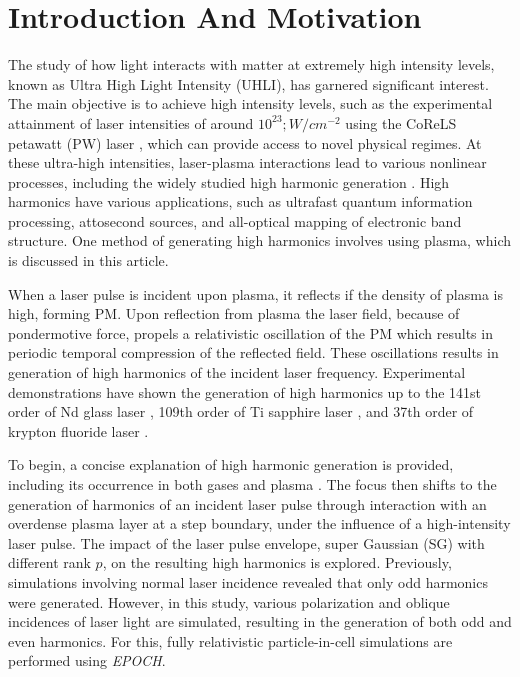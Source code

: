 \documentclass[12pt]{article}
\begin{document}
\section{Introduction And Motivation}
The study of how light interacts with matter at extremely high intensity levels, known as Ultra High Light Intensity (UHLI), has garnered significant interest.  The main objective is to achieve high intensity levels, such as the experimental attainment of laser intensities of around $10^{23} ; W/cm^{-2}$ using the CoReLS petawatt (PW) laser \cite{highintensity}, which can provide access to novel physical regimes. At these ultra-high intensities, laser-plasma interactions lead to various nonlinear processes, including the widely studied high harmonic generation \cite{henri}. High harmonics have various applications, such as ultrafast quantum information processing, attosecond sources, and all-optical mapping of electronic band structure. One method of generating high harmonics involves using plasma, which is discussed in this article.

When a laser pulse is incident upon plasma, it reflects if the density of plasma is high, forming PM. Upon reflection from plasma the laser field, because of pondermotive force, propels a relativistic oscillation of the PM which results in periodic temporal compression of the reflected field. These oscillations results in generation of high harmonics of the incident laser frequency.\cite{lichters} Experimental demonstrations have shown the generation of high harmonics up to the 141st order of Nd glass laser \cite{hormonics1}, 109th order of Ti sapphire laser \cite{hormonics2}, and 37th order of krypton fluoride laser \cite{hormonics3}.

To begin, a concise explanation of high harmonic generation is provided, including its occurrence in both gases \cite{gas-main}\cite{gas-second} and plasma \cite{hhg-relativistic}\cite{hhg-main}\cite{hhg-second}\cite{history-similarity}\cite{universal-spectra}. The focus then shifts to the generation of harmonics of an incident laser pulse through interaction with an overdense plasma layer at a step boundary, under the influence of a high-intensity laser pulse. The impact of the laser pulse envelope, super Gaussian (SG) with different rank $p$, on the resulting high harmonics is explored. Previously, simulations involving normal laser incidence revealed that only odd harmonics were generated. However, in this study, various polarization and oblique incidences of laser light are simulated, resulting in the generation of both odd and even harmonics. For this, fully relativistic particle-in-cell simulations are performed using \textit{EPOCH}\cite{EPOCH}.
\end{document}
